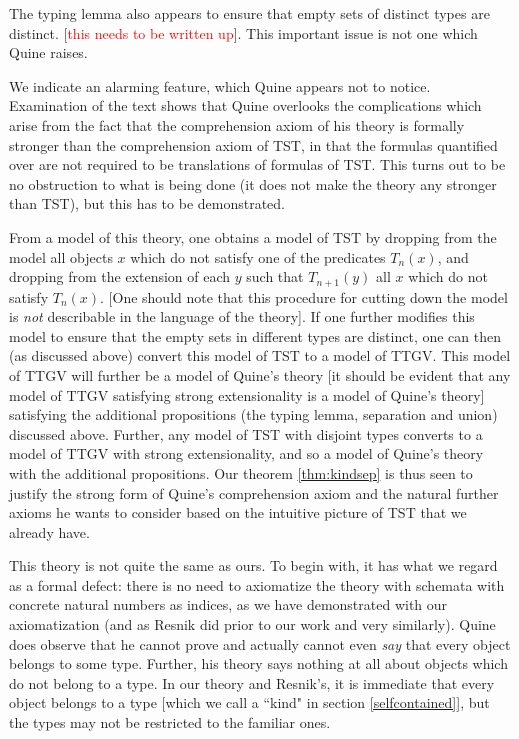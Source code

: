 \documentclass[12pt]{article}
\begin{document}
The typing lemma also appears to ensure that empty sets of distinct types are distinct. [\textcolor{red}{this needs to be written up}].  This important issue is not one which Quine raises.

We indicate an alarming feature, which Quine appears not to notice.  Examination of the text shows that Quine overlooks the complications which arise from the fact that the comprehension axiom of his theory is formally stronger than the comprehension axiom of TST, in that the formulas quantified over are not required to be translations of formulas of TST.  This turns out to be no obstruction to what is being done (it does not make the theory any stronger than TST), but this has to be demonstrated.

From a model of this theory, one obtains a model of TST by dropping from the model all objects $x$ which do not satisfy one of the predicates $T_n(x)$, and dropping from the extension of each $y$ such that $T_{n+1}(y)$ all $x$ which do not satisfy $T_n(x)$.  [One should note that this procedure for cutting down the model is {\em not\/} describable in the language of the theory].   If one further modifies this model to ensure that the empty sets in different types are distinct, one can then (as discussed above) convert this model of TST to a model of TTGV. This model of TTGV will further be a model of Quine's theory [it should be evident that any model of TTGV satisfying strong extensionality is a model of Quine's theory] satisfying the additional propositions (the typing lemma, separation and union) discussed above.  Further, any model of TST with disjoint types converts to a model of TTGV with strong extensionality, and so a model of Quine's theory with the additional propositions.  Our theorem \ref{thm:kindsep} is thus seen to justify the strong form of Quine's comprehension axiom and the natural further axioms he wants to consider based on the intuitive picture of TST that we already have.





This theory is not quite the same as ours.  To begin with, it has what we regard as a formal defect:  there is no need to axiomatize the theory with schemata with concrete natural numbers as indices, as we have demonstrated with our axiomatization (and as Resnik did prior to our work and very similarly).  Quine does observe that he cannot prove and actually cannot even {\sl say} that every object belongs to some type.  Further, his theory says nothing at all about objects which do not belong to a type. In our theory and Resnik's, it is immediate that every object belongs to a type [which we call a ``kind" in section \ref{selfcontained}], but the types may not be restricted to the familiar ones.
\end{document}
